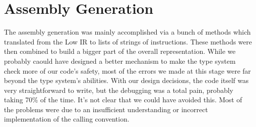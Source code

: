 \documentclass[11pt]{article}
\begin{document}
\section {Assembly Generation}  
\label{sec:assembly}
The assembly generation was mainly accomplished via a bunch of methods which
translated from the Low IR to lists of strings of instructions. These methods
were then combined to build a bigger part of the overall representation. While
we probably caould have designed a better mechanism to make the type system
check more of our code's safety, most of the errors we made at this stage were
far beyond the type system's abilities. With our design decisions, the code
itself was very straightforward to write, but the debugging was a total pain,
probably taking 70\% of the time. It's not clear that we could have avoided
this. Most of the problems were due to an insufficient understanding or
incorrect implementation of the calling convention.
\end{document}

